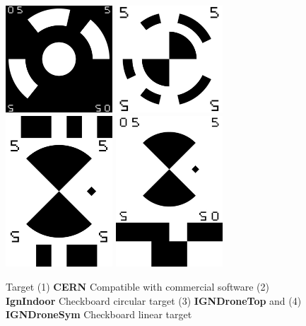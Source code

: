 \begin{figure}
\centering
   \includegraphics[width=4cm]{Methods/Images/CERN-055.jpg}
   \includegraphics[width=4cm]{Methods/Images/IgnIndoor-55.jpg}
   \includegraphics[width=4cm]{Methods/Images/IGNDRonSym_55.jpg}
   \includegraphics[width=4cm]{Methods/Images/IGNDroneTop_55.jpg}
    \caption{Target (1) {\bf CERN} Compatible with commercial software 
                    (2) {\bf IgnIndoor} Checkboard circular target 
		    (3) {\bf IGNDroneTop} and (4) {\bf IGNDroneSym} Checkboard linear target
            }
\label{fig:CodedTarget}
\end{figure}

